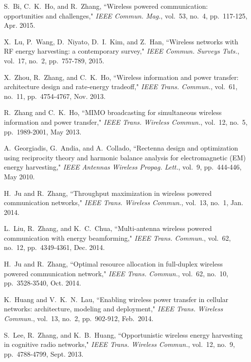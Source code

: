 \documentclass[journal, draftcls, one column, 12pt]{IEEEtran}
\begin{document}
\begin{thebibliography}{1}
\footnotesize

S.~Bi, C.~K.~Ho, and R.~Zhang, ``Wireless powered communication: opportunities and challenges," \emph{IEEE Commun. Mag.}, vol.~53, no.~4, pp.~117-125, Apr. 2015.

X.~Lu, P.~Wang, D.~Niyato, D.~I.~Kim, and Z.~Han, ``Wireless networks with RF energy harvesting: a contemporary survey," \emph{IEEE Commun. Surveys Tuts.}, vol.~17, no.~2, pp.~757-789, 2015.

X.~Zhou, R.~Zhang, and C.~K.~Ho, ``Wireless information and power transfer: architecture design and rate-energy tradeoff," \emph{IEEE Trans. Commun.}, vol.~61, no.~11, pp.~4754-4767, Nov. 2013.

R.~Zhang and C.~K.~Ho, ``MIMO broadcasting for simultaneous wireless information and power transfer," \emph{IEEE Trans. Wireless Commun.}, vol.~12, no.~5, pp.~1989-2001, May 2013.

A.~Georgiadis, G.~Andia, and A.~Collado, ``Rectenna design and optimization using reciprocity theory and harmonic balance analysis for electromagnetic (EM) energy harvesting," \emph{IEEE Antennas Wireless Propag. Lett.}, vol.~9, pp.~444-446, May 2010.

H.~Ju and R.~Zhang, ``Throughput maximization in wireless powered communication networks," \emph{IEEE Trans. Wireless Commun.}, vol.~13, no.~1, Jan. 2014.

L.~Liu, R.~Zhang, and K.~C.~Chua,  ``Multi-antenna wireless powered communication with energy beamforming," \emph{IEEE Trans. Commun.}, vol.~62, no.~12, pp.~4349-4361, Dec. 2014.

H.~Ju and R.~Zhang, ``Optimal resource allocation in full-duplex wireless powered communication network," \emph{IEEE Trans. Commun.}, vol.~62, no.~10, pp.~3528-3540, Oct. 2014.

K.~Huang and V.~K.~N.~Lau, ``Enabling wireless power transfer in cellular networks: architecture, modeling and deployment," \emph{IEEE Trans. Wireless Commun.}, vol.~13, no.~2, pp.~902-912, Feb.~2014.

S.~Lee, R.~Zhang, and K.~B.~Huang, ``Opportunistic wireless energy harvesting in cognitive radio networks," \emph{IEEE Trans. Wireless Commun.}, vol.~12, no.~9, pp.~4788-4799, Sept. 2013.


\end{thebibliography}
\end{document}
